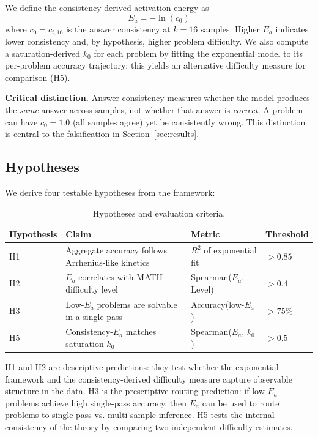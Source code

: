 \documentclass{article}
\begin{document}
We define the consistency-derived activation energy as
\begin{equation}
E_a = -\ln(c_0)
\end{equation}
where $c_0 = c_{i,16}$ is the answer consistency at $k = 16$ samples. Higher $E_a$ indicates lower consistency and, by hypothesis, higher problem difficulty. We also compute a saturation-derived $k_0$ for each problem by fitting the exponential model to its per-problem accuracy trajectory; this yields an alternative difficulty measure for comparison (H5).

\textbf{Critical distinction.} Answer consistency measures whether the model produces the \textit{same} answer across samples, not whether that answer is \textit{correct}. A problem can have $c_0 = 1.0$ (all samples agree) yet be consistently wrong. This distinction is central to the falsification in Section~\ref{sec:results}.

\subsection{Hypotheses}

We derive four testable hypotheses from the framework:

\begin{table}[t]
\caption{Hypotheses and evaluation criteria.}
\label{tab:hypotheses}
\centering
\begin{tabular}{llll}
\toprule
Hypothesis & Claim & Metric & Threshold \\
\midrule
H1 & Aggregate accuracy follows Arrhenius-like kinetics & $R^2$ of exponential fit & $> 0.85$ \\
H2 & $E_a$ correlates with MATH difficulty level & Spearman($E_a$, Level) & $> 0.4$ \\
H3 & Low-$E_a$ problems are solvable in a single pass & Accuracy(low-$E_a$) & $> 75\%$ \\
H5 & Consistency-$E_a$ matches saturation-$k_0$ & Spearman($E_a$, $k_0$) & $> 0.5$ \\
\bottomrule
\end{tabular}
\end{table}

H1 and H2 are descriptive predictions: they test whether the exponential framework and the consistency-derived difficulty measure capture observable structure in the data. H3 is the prescriptive routing prediction: if low-$E_a$ problems achieve high single-pass accuracy, then $E_a$ can be used to route problems to single-pass vs. multi-sample inference. H5 tests the internal consistency of the theory by comparing two independent difficulty estimates.
\end{document}
